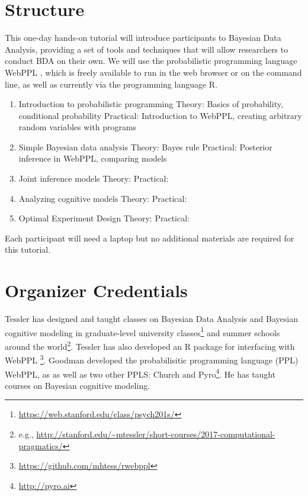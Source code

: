 \documentclass[10pt,letterpaper]{article}
\begin{document}
\section{Structure}

This one-day hands-on tutorial will introduce participants to Bayesian Data Analysis, providing a set of tools and techniques that will allow researchers to conduct BDA on their own. 
We will use the probabilistic programming language WebPPL \cite{dippl}, which is freely available to run in the web browser or on the command line, as well as currently via the programming language R. 

\begin{enumerate}
\item Introduction to probabilistic programming
	\subitem Theory: Basics of probability, conditional probability
	\subitem Practical: Introduction to WebPPL, creating arbitrary random variables with programs
\item Simple Bayesian data analysis
	\subitem Theory: Bayes rule 
	\subitem Practical: Posterior inference in WebPPL, comparing models
\item Joint inference models
	\subitem Theory: 
	\subitem Practical:
\item Analyzing cognitive models
	\subitem Theory:
	\subitem Practical:
\item Optimal Experiment Design
	\subitem Theory:
	\subitem Practical:
\end{enumerate}

Each participant will need a laptop but no additional materials are required for this tutorial. 

\section{Organizer Credentials}

Tessler has designed and taught classes on Bayesian Data Analysis and Bayesian cognitive modeling in graduate-level university classes\footnote{
\url{https://web.stanford.edu/class/psych201s/}
} and summer schools around the world\footnote{
e.g., \url{http://stanford.edu/~mtessler/short-courses/2017-computational-pragmatics/}}. 
Tessler has also developed an R package for interfacing with WebPPL \footnote{\url{https://github.com/mhtess/rwebppl}}.
Goodman developed the probabilisitic programming language (PPL) WebPPL, as as well as two other PPLS: Church \cite{church} and Pyro\footnote{\url{http://pyro.ai}}.
He has taught courses on Bayesian cognitive modeling.



\setlength{\bibleftmargin}{.125in}
\setlength{\bibindent}{-\bibleftmargin}


\end{document}
